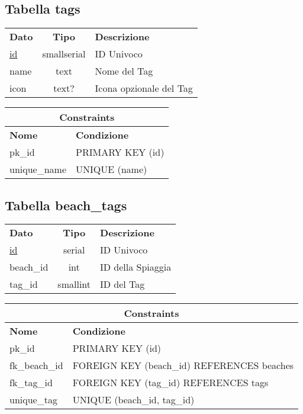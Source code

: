 \begin{center}
    \subsection*{Tabella \textnormal{tags}}
    
    \begin{tabularx}{\textwidth}{l c X}
        \toprule
        \textbf{Dato} & \textbf{Tipo} & \textbf{Descrizione}\\
        \underline{id} & smallserial & ID Univoco \\
        name & text & Nome del Tag\\
        icon & text? & Icona opzionale del Tag\\
        \midrule
    \end{tabularx}
    \begin{tabularx}{\textwidth}{l X}
        \multicolumn{2}{c}{\textbf{Constraints}}\\
        \midrule
        \textbf{Nome} & \textbf{Condizione}\\
        pk\_id & PRIMARY KEY (id)\\
        unique\_name & UNIQUE (name)\\
        \bottomrule
    \end{tabularx}
    \bigskip
\end{center}

\begin{center}
    \subsection*{Tabella \textnormal{beach\_tags}}
    
    \begin{tabularx}{\textwidth}{l c X}
        \toprule
        \textbf{Dato} & \textbf{Tipo} & \textbf{Descrizione}\\
        \underline{id} & serial & ID Univoco \\
        beach\_id & int & ID della Spiaggia\\
        tag\_id & smallint & ID del Tag\\
        \midrule
    \end{tabularx}
    \begin{tabularx}{\textwidth}{l X}
        \multicolumn{2}{c}{\textbf{Constraints}}\\
        \midrule
        \textbf{Nome} & \textbf{Condizione}\\
        pk\_id & PRIMARY KEY (id)\\
        fk\_beach\_id & FOREIGN KEY (beach\_id) REFERENCES beaches\\
        fk\_tag\_id & FOREIGN KEY (tag\_id) REFERENCES tags\\
        unique\_tag & UNIQUE (beach\_id, tag\_id)\\
        \bottomrule
    \end{tabularx}
    \bigskip
\end{center}

